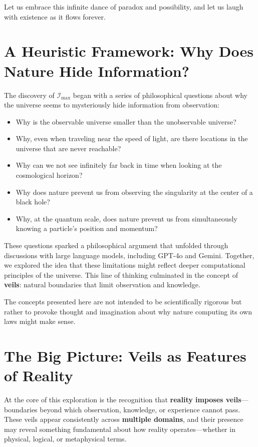\documentclass[12pt]{article}
\begin{document}
Let us embrace this infinite dance of paradox and possibility, and let us laugh with existence as it flows forever.


\appendix

\section{A Heuristic Framework: Why Does Nature Hide Information?}

The discovery of $\mathcal{I}_{\text{max}}$ began with a series of philosophical questions about why the universe seems to mysteriously hide information from observation:
\begin{itemize}
    \item Why is the observable universe smaller than the unobservable universe?
    \item Why, even when traveling near the speed of light, are there locations in the universe that are never reachable?
    \item Why can we not see infinitely far back in time when looking at the cosmological horizon?
    \item Why does nature prevent us from observing the singularity at the center of a black hole?
    \item Why, at the quantum scale, does nature prevent us from simultaneously knowing a particle's position and momentum?
\end{itemize}

These questions sparked a philosophical argument that unfolded through discussions with large language models, including GPT-4o and Gemini. Together, we explored the idea that these limitations might reflect deeper computational principles of the universe. This line of thinking culminated in the concept of \textbf{veils}: natural boundaries that limit observation and knowledge.

The concepts presented here are not intended to be scientifically rigorous but rather to provoke thought and imagination about why nature computing its own laws might make sense.


\section{The Big Picture: Veils as Features of Reality}

At the core of this exploration is the recognition that \textbf{reality imposes veils}—boundaries beyond which observation, knowledge, or experience cannot pass. These veils appear consistently across \textbf{multiple domains}, and their presence may reveal something fundamental about how reality operates—whether in physical, logical, or metaphysical terms.
\end{document}
